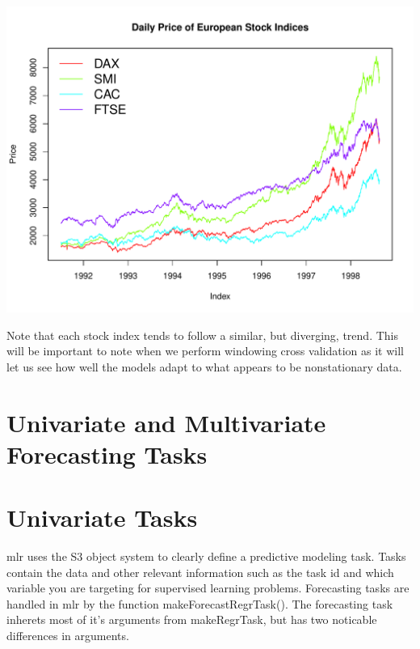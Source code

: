 \documentclass[12pt]{article}\usepackage[]{graphicx}\usepackage[]{color}
\makeatletter
\def\maxwidth{ %
  \ifdim\Gin@nat@width>\linewidth
    \linewidth
  \else
    \Gin@nat@width
  \fi
}
\newenvironment{knitrout}{}{} %
\theoremstyle{definition}
\newcommand\code{\@codex}
\def\@codex#1{{\normalfont\ttfamily\hyphenchar\font=-1 #1}}
\newcommand{\pkg}[1]{{\fontseries{b}\selectfont #1}}
\makeatother
\begin{document}
\begin{knitrout}
\color{fgcolor}

{\centering \includegraphics[width=\maxwidth]{figure/plot_dat_stocks-1} 

}



\end{knitrout}

Note that each stock index tends to follow a similar, but diverging, trend. This will be important to note when we perform windowing cross validation as it will let us see how well the models adapt to what appears to be nonstationary data.

\section{Univariate and Multivariate Forecasting Tasks}
\label{sec:task}

\section{Univariate Tasks}

\pkg{mlr} uses the S3 object system to clearly define a predictive modeling task. Tasks contain the data and other relevant information such as the task id and which variable you are targeting for supervised learning problems. Forecasting tasks are handled in \pkg{mlr} by the function \code{makeForecastRegrTask()}. The forecasting task inherets most of it's arguments from \code{makeRegrTask}, but has two noticable differences in arguments.
\end{document}
